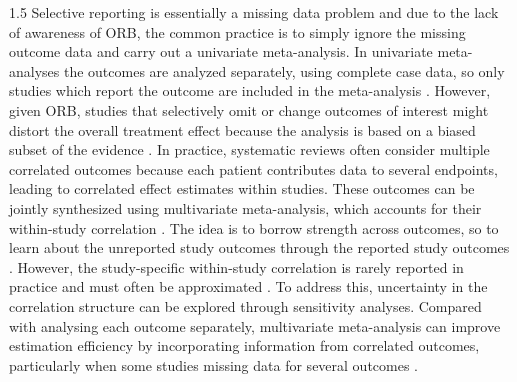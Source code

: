 \documentclass{article}
\begin{document}
\begin{spacing}{1.5}
Selective reporting is essentially a missing data problem and due to the lack of awareness of ORB, the common practice is to simply ignore the missing outcome data and carry out a univariate meta-analysis. In univariate meta-analyses the outcomes are analyzed separately, using complete case data, so only studies which report the outcome are included in the meta-analysis \cite{riley2007evaluation}. However, given ORB, studies that selectively omit or change outcomes of interest might distort the overall treatment effect because the analysis is based on a biased subset of the evidence \cite{thomas2022catalogue, dwan2010assessing}. In practice, systematic reviews often consider multiple correlated outcomes because each patient contributes data to several endpoints, leading to correlated effect estimates within studies. These outcomes can be jointly synthesized using multivariate meta-analysis, which accounts for their within-study correlation \cite{riley2007evaluation, jackson2011multivariate}. The idea is to borrow strength across outcomes, so to learn about the unreported study outcomes through the reported study outcomes \cite{kirkham2012multivariate}. However, the study-specific within-study correlation is rarely reported in practice and must often be approximated \cite{riley2009multivariate}. To address this, uncertainty in the correlation structure can be explored through sensitivity analyses. Compared with analysing each outcome separately, multivariate meta-analysis can improve estimation efficiency by incorporating information from correlated outcomes, particularly when some studies missing data for several outcomes \cite{jackson2011multivariate, riley2009multivariate, frosi2015multivariate}.


\end{spacing}
\end{document}
